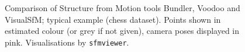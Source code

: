 \begin{figure}[htb!]
 \centering
 \caption{Comparison of Structure from Motion tools Bundler, Voodoo and VisualSfM; typical example (chess dataset). Points shown in estimated colour (or grey if not given), camera poses displayed in pink. Visualisations by \texttt{sfmviewer}.}
 \label{fig:sfmcomparison1}
\end{figure}

